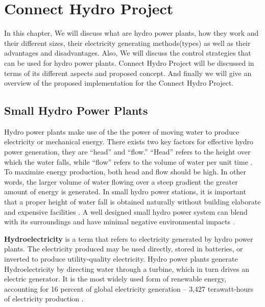 \chapter{Connect Hydro Project}
\label{ChapterThree}
In this chapter, We will discuss what are hydro power plants, how they work and their different sizes, their electricity generating methods(types) as well as their advantages and disadvantages. Also, We will discuss the control strategies that can be used for hydro power plants. Connect Hydro Project will be discussed in terms of its different aspects and proposed concept. And finally we will give an overview of the proposed implementation for the Connect Hydro Project.
\section{Small Hydro Power Plants}
\label{SmallHydroPowerPlants}
Hydro power plants make use of the the power of moving water to produce electricity or mechanical energy. There exists two key factors for effective hydro power generation, they are “head” and “flow.” “Head” refers to the height over which the water falls, while “flow” refers to the volume of water per unit time \cite{SmallScale}. To maximize energy production, both head and flow should be high. In other words, the larger volume of water flowing over a steep gradient the greater amount of energy is generated. In small hydro power stations, it is important that a proper height of water fall is obtained naturally without building elaborate and expensive facilities \cite{SmallScale,HydroPower}. A well designed small hydro power system can blend with its surroundings and have minimal negative environmental impacts \cite{SmallScale,HydroPower}.

\textbf{Hydroelectricity} is a term that refers to electricity generated by hydro power plants. The electricity produced may be used directly, stored in batteries, or inverted to produce utility-quality electricity. Hydro power plants generate Hydroelectricity by directing water through a turbine, which in turn drives an electric generator. It is the most widely used form of renewable energy, accounting for 16 percent of global electricity generation – 3,427 terawatt-hours of electricity production \cite{HydroPower}.

